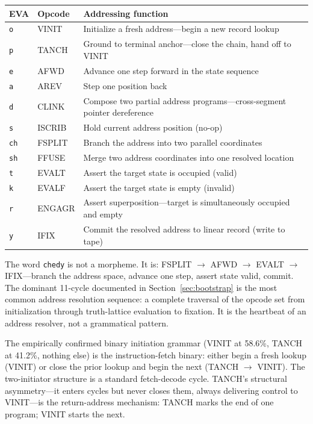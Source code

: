 \documentclass[12pt,a4paper]{article}
\begin{document}
\begin{table}[htbp]
\centering
\small
{}
\begin{tabularx}{\textwidth}{>{\centering\arraybackslash}X >{\centering\arraybackslash}X >{\raggedright\arraybackslash}X}
\toprule
\rowcolor{gray!25}\textbf{EVA} & \textbf{Opcode} & \textbf{Addressing function} \\
\midrule
\rowcolors{1}{white}{gray!10}
\texttt{o}  & VINIT  & Initialize a fresh address---begin a new record lookup \\
\texttt{p}  & TANCH  & Ground to terminal anchor---close the chain, hand off to VINIT \\
\texttt{e}  & AFWD   & Advance one step forward in the state sequence \\
\texttt{a}  & AREV   & Step one position back \\
\texttt{d}  & CLINK  & Compose two partial address programs---cross-segment pointer dereference \\
\texttt{s}  & ISCRIB & Hold current address position (no-op) \\
\texttt{ch} & FSPLIT & Branch the address into two parallel coordinates \\
\texttt{sh} & FFUSE  & Merge two address coordinates into one resolved location \\
\texttt{t}  & EVALT  & Assert the target state is occupied (valid) \\
\texttt{k}  & EVALF  & Assert the target state is empty (invalid) \\
\texttt{r}  & ENGAGR & Assert superposition---target is simultaneously occupied and empty \\
\texttt{y}  & IFIX   & Commit the resolved address to linear record (write to tape) \\
\bottomrule
\end{tabularx}
\end{table}

The word \texttt{chedy} is not a morpheme. It is: FSPLIT $\to$ AFWD $\to$ EVALT $\to$ IFIX---branch the address space, advance one step, assert state valid, commit. The dominant 11-cycle documented in Section~\ref{sec:bootstrap} is the most common address resolution sequence: a complete traversal of the opcode set from initialization through truth-lattice evaluation to fixation. It is the heartbeat of an address resolver, not a grammatical pattern.

The empirically confirmed binary initiation grammar (VINIT at 58.6\%, TANCH at 41.2\%, nothing else) is the instruction-fetch binary: either begin a fresh lookup (VINIT) or close the prior lookup and begin the next (TANCH $\to$ VINIT). The two-initiator structure is a standard fetch-decode cycle. TANCH's structural asymmetry---it enters cycles but never closes them, always delivering control to VINIT---is the return-address mechanism: TANCH marks the end of one program; VINIT starts the next.
\end{document}
